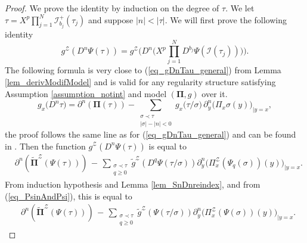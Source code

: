\documentclass[11pt]{preprint}
\newcommand{\mcI}{\mathcal{I}}
\newcommand{\mcZ}{\mathcal{Z}}
\def\PPi{\boldsymbol{\Pi}}
\def\eqref#1{(\ref{#1})}
\begin{document}
\begin{proof}
We prove the identity by induction on the degree of $\tau$. We let $\tau = X^p \prod_{j=1}^{N} \mcI_{b_j}^+(\tau_j)$ and suppose $|n|<|\tau|$.
We will first prove the following identity
\begin{equation}\label{eq_preuveZDnPsiTau_ZPsiDnTau}
	{ g}^\mcZ\left(D^n \Psi(\tau)  \right) = { g}^\mcZ \Big( D^n \Big( X^p \prod_{j=1}^{N} D^{b_j} \Psi( \mcI(\tau_j) )   \Big)    \Big).
\end{equation}
The following formula is very close to \eqref{eq_gDnTau_general} from Lemma \ref{lem_derivModifModel} and is valid for any regularity structure satisfying Assumption \ref{assumption_notint} and model $(\PPi,g)$ over it.
\begin{equation}\label{eq_gDnTau_general_withouttilde}
	{ g}_x\big( D^n\tau \big)	= 
	\partial^n(\PPi(\tau))
	- 
	\sum_{\substack{\sigma\prec\tau\\  |\sigma|-|n|<0}} { g}_x\big(\tau/\sigma) \, \partial^n_{y} \big({\Pi}_x\sigma(y)\big)_{|y=x},
\end{equation}
the proof follows the same line as for \eqref{eq_gDnTau_general} and can be found in \cite[Lemma 16]{BailleulHoshinoRS1}. Then the function ${ g}^\mcZ\left(D^n \Psi(\tau)  \right)$ is equal to
\begin{align*}
	&\partial^{n}\left( \widetilde{\PPi}^\mcZ(\Psi(\tau) )\right) \, - \, \sum_{\substack{\sigma\prec\tau \\ q\geq 0}} \widetilde{ g}^\mcZ\left(D^q\Psi(\tau/\sigma)\right) \partial^n_y \Big({\Pi}^\mcZ_x (\Psi_q(\sigma))(y)\Big)_{|y=x}.
\end{align*}
From induction hypothesis and Lemma \ref{lem_SnDnreindex}, and from \eqref{eq_PsinAndPsi}, this is equal to  
	\begin{align*}
		&\partial^{n}\left( \widetilde{\PPi}^\mcZ(\Psi(\tau) )\right) \, - \, \sum_{\substack{\sigma\prec\tau \\ q\geq 0}} \widetilde{ g}^\mcZ\left(\Psi(\tau/\sigma)\right) \partial^n_y \Big({\Pi}^\mcZ_x (\Psi(\sigma))(y)\Big)_{|y=x}.
	\end{align*}



\end{proof}
\end{document}
